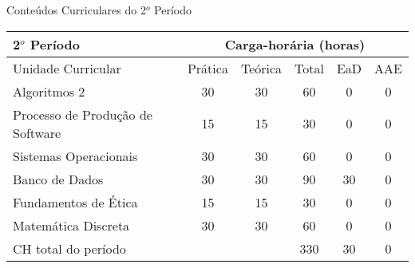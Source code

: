 \begin{quadro}[ht!]
\centering
\caption{Conteúdos Curriculares do 2$^o$ Período}\label{qua:periodo2}
\begin{tabular}{|p{8.0cm}|c|c|c|c|c|}
\hline
\rowcolor{blue1} 2$^o$ Período & \multicolumn{5}{|c|}{\centering Carga-horária (horas)} \\ \hline
\rowcolor{blue1} Unidade Curricular & Prática & Teórica & Total & EaD & AAE \\ \hline
Algoritmos 2 & 30 & 30 & 60 & 0	&	0 \\	\hline
Processo de Produção de Software & 15 & 15 & 30 & 0	&	0 \\	\hline
Sistemas Operacionais & 30 & 30 & 60 & 0	&	0 \\	\hline
Banco de Dados & 30 & 30 & 90 & 30	&	0 \\	\hline
Fundamentos de Ética & 15 & 15 & 30 & 0	&	0 \\	\hline
Matemática Discreta & 30 & 30 & 60 & 0	&	0 \\	\hline
CH total do período & \multicolumn{2}{p{3.3cm}|}{\cellcolor{blue1}} & 330 & 30	&	0 \\ \hline
\end{tabular} \end{quadro}